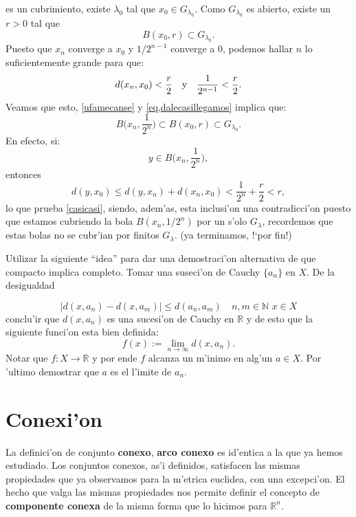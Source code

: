\begin{demo}
es un cubrimiento, existe $\lambda_0$ tal que $x_0\in G_{\lambda_0}$. Como
$G_{\lambda_0}$ es abierto, existe un $r>0$ tal que
\begin{equation}\label{eq,dalecasillegamos}
	B(x_0,r)\subset G_{\lambda_0}.
\end{equation}
Puesto que $x_n$ converge a $x_0$ y $1/2^{n-1}$ converge a 0,
podemos hallar $n$ lo suficientemente grande para que:
\begin{equation}\label{ufamecanse}
	d(x_n,x_0)<\frac{r}{2}\quad\hbox{y}\quad
	\frac{1}{2^{n-1}}<\frac{r}{2}.
\end{equation}
Veamos que esto, \eqref{ufamecanse} y \eqref{eq,dalecasillegamos}
implica que:
\begin{equation}\label{casicasi}
	B\Big(x_n,\frac{1}{2^n}\Big)\subset B(x_0,r)\subset G_{\lambda_0}.
\end{equation}
En efecto, si:
\[
	 y\in B\Big(x_n,\frac{1}{2^n}\Big),
\]
entonces
\[
	d(y,x_0)\leq d(y,x_n)+d(x_n,x_0)<\frac{1}{2^n}+\frac{r}{2}<r,
\]
lo que prueba \eqref{casicasi}, siendo, adem'as, esta inclusi'on
una contradicci'on puesto que estamos cubriendo la bola
$B(x_n,1/2^n)$ por un s'olo $G_{\lambda}$, recordemos que estas
bolas no se cubr'ian por finitos $G_{\lambda}$. (ya terminamos,
!`por fin!)
 \end{demo}

 \begin{ejercicio} Utilizar la siguiente ``idea'' para dar una
 demostraci'on alternativa de que compacto implica completo. Tomar
 una suseci'on de Cauchy $\{a_n\}$ en $X$. De la desigualdad

 \[
	|d(x,a_n)-d(x,a_m)|\leq d(a_n,a_m)\quad n,m\in\mathbb{N}\,\,
	x\in X
 \]
 conclu'ir que $d(x,a_n)$ es una sucesi'on de Cauchy en
 $\mathbb{R}$ y de esto que la siguiente funci'on esta bien
 definida:
\[
	f(x):=\lim\limits_{n\to\infty}d(x,a_n).
\]
Notar que $f:X\to\mathbb{R}$ y por ende $f$ alcanza un m'inimo en
alg'un $a\in X$. Por 'ultimo demostrar que $a$ es el l'imite de
$a_n$.
\end{ejercicio}

\section{Conexi'on}La definici'on de conjunto \textbf{conexo},
\textbf{arco conexo} es id'entica a la que ya hemos estudiado. Los
conjuntos conexos, as'i definidos, satisfacen las mismas
propiedades que ya observamos para la m'etrica euclidea, con una
excepci'on. El hecho que valga las mismas propiedades nos permite
definir el concepto de \textbf{componente conexa} de la misma
forma que lo hicimos para $\mathbb{R}^n$.

